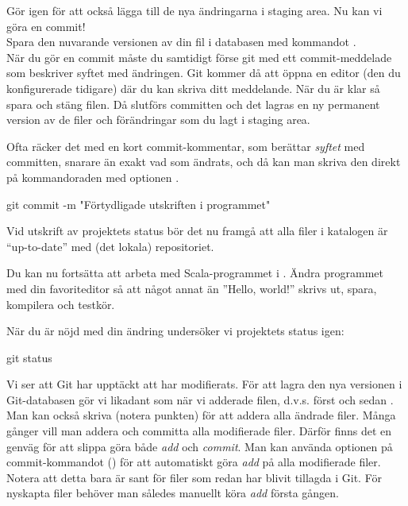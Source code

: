 \begin{Datorarbete}
	Gör  igen för att också lägga till de nya ändringarna i staging area. Nu kan vi göra en commit!
	\\

	\code{[\ref{git-commit}]} Spara den nuvarande versionen av din fil i databasen med kommandot .
	\\

	När du gör en commit måste du samtidigt förse git med ett commit-meddelade som beskriver syftet med ändringen. Git kommer då att öppna en editor (den du konfigurerade tidigare) där du kan skriva ditt meddelande. När du är klar så spara och stäng filen. Då slutförs committen och det lagras en ny permanent version av de filer och förändringar som du lagt i staging area.

	Ofta räcker det med en kort commit-kommentar, som berättar \emph{syftet} med committen, snarare än exakt vad som ändrats, och då kan man skriva den direkt på kommandoraden med optionen .

	\begin{Code}
		git commit -m "Förtydligade utskriften i programmet"
	\end{Code}

	Vid utskrift av projektets status bör det nu framgå att alla filer i katalogen är ``up-to-date'' med (det lokala) repositoriet.

	Du kan nu fortsätta att arbeta med Scala-programmet i . Ändra programmet med din favoriteditor så att något annat än ''Hello, world!'' skrivs ut, spara, kompilera och testkör.

	När du är nöjd med din ändring undersöker vi projektets status igen:

	\begin{Code}
		git status
	\end{Code}

	Vi ser att Git har upptäckt att  har modifierats. För att lagra den nya versionen i Git-databasen gör vi likadant som när vi adderade filen, d.v.s. först  och sedan . Man kan också skriva   (notera punkten) för att addera alla ändrade filer.	Många gånger vill man addera och committa alla modifierade filer. Därför finns det en genväg för att slippa göra både \emph{add} och \emph{commit}. Man kan använda optionen  på commit-kommandot () för att automatiskt göra \emph{add} på alla modifierade filer. Notera att detta bara är sant för filer som redan har blivit tillagda i Git. För nyskapta filer behöver man således manuellt köra \emph{add} första gången.
	\\


\end{Datorarbete}
